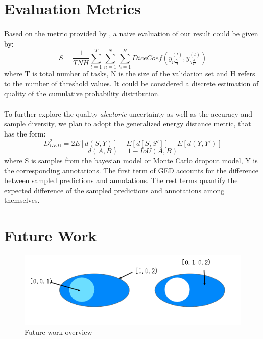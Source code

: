 \documentclass[12pt]{extarticle}
\begin{document}
\section{Evaluation Metrics}
\paragraph{}
Based on the metric provided by \cite{qubiq}, a naive evaluation of our result could be given by:
\begin{equation}
    S = \frac{1}{TNH}\sum_{t=1}^{T}\sum_{n=1}^{N}\sum_{h=1}^{H}DiceCoef(y_{p\frac{h}{H}}^{(t)}, y_{g\frac{h}{H}}^{(t)})
\end{equation}
where T is total number of tasks, N is the size of the validation set and H refers to 
the number of threshold values. It could be considered a discrete estimation of quality of the cumulative probability 
distribution.
\paragraph{}
To further explore the quality \textit{aleatoric} uncertainty as well as the accuracy and sample diversity, we plan to 
adopt the generalized energy distance metric, that has the form:
\begin{equation}
    D^2_{GED} = 2E[d(S, Y)] - E[d[S, S']] - E[d(Y, Y')]
\end{equation}
\begin{equation}
    d(A, B) = 1 - IoU(A, B)
\end{equation}
where S is samples from the bayesian model or Monte Carlo dropout model, Y is the corresponding 
annotations. The first term of GED accounts for the difference between sampled predictions
and annotations. The rest terms quantify the expected difference of the sampled predictions and 
annotations among themselves. 

\section{Future Work}
\begin{figure}[ht!]
\centering
\includegraphics[scale=0.5]{fig5.png}
\caption{Future work overview}
\label{future work}
\end{figure}
\end{document}
